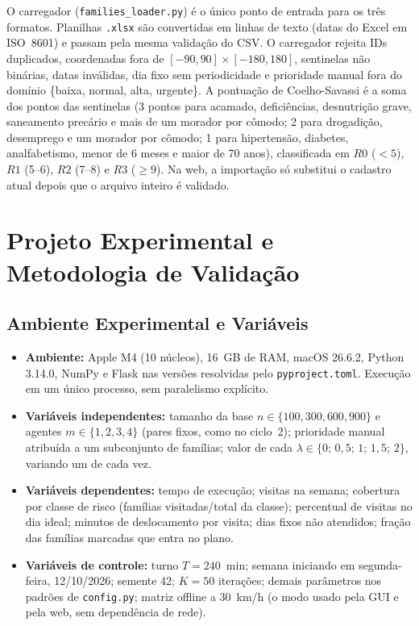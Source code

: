 \documentclass[11pt,a4paper]{article}
\begin{document}
O carregador (\texttt{families\_loader.py}) é o único ponto de entrada para os três formatos. Planilhas \texttt{.xlsx} são convertidas em linhas de texto (datas do Excel em ISO~8601) e passam pela mesma validação do CSV. O carregador rejeita IDs duplicados, coordenadas fora de $[-90,90]\times[-180,180]$, sentinelas não binárias, datas inválidas, dia fixo sem periodicidade e prioridade manual fora do domínio \{baixa, normal, alta, urgente\}. A pontuação de Coelho-Savassi é a soma dos pontos das sentinelas (3 pontos para acamado, deficiências, desnutrição grave, saneamento precário e mais de um morador por cômodo; 2 para drogadição, desemprego e um morador por cômodo; 1 para hipertensão, diabetes, analfabetismo, menor de 6 meses e maior de 70 anos), classificada em $R0$ ($<5$), $R1$ (5--6), $R2$ (7--8) e $R3$ ($\geq 9$). Na web, a importação só substitui o cadastro atual depois que o arquivo inteiro é validado.

\section{Projeto Experimental e Metodologia de Validação}

\subsection{Ambiente Experimental e Variáveis}
\begin{itemize}
    \item \textbf{Ambiente:} Apple M4 (10 núcleos), 16~GB de RAM, macOS 26.6.2, Python 3.14.0, NumPy e Flask nas versões resolvidas pelo \texttt{pyproject.toml}. Execução em um único processo, sem paralelismo explícito.
    \item \textbf{Variáveis independentes:} tamanho da base $n \in \{100, 300, 600, 900\}$ e agentes $m \in \{1,2,3,4\}$ (pares fixos, como no ciclo~2); prioridade manual atribuída a um subconjunto de famílias; valor de cada $\lambda \in \{0;\,0{,}5;\,1;\,1{,}5;\,2\}$, variando um de cada vez.
    \item \textbf{Variáveis dependentes:} tempo de execução; visitas na semana; cobertura por classe de risco (famílias visitadas/total da classe); percentual de visitas no dia ideal; minutos de deslocamento por visita; dias fixos não atendidos; fração das famílias marcadas que entra no plano.
    \item \textbf{Variáveis de controle:} turno $T = 240$~min; semana iniciando em segunda-feira, 12/10/2026; semente 42; $K = 50$ iterações; demais parâmetros nos padrões de \texttt{config.py}; matriz offline a 30~km/h (o modo usado pela GUI e pela web, sem dependência de rede).
\end{itemize}
\end{document}
